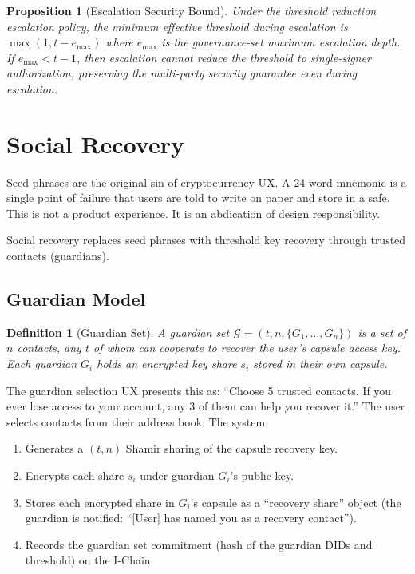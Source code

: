 \documentclass[11pt,a4paper]{article}
\newtheorem{proposition}[theorem]{Proposition}
\newtheorem{definition}{Definition}
\begin{document}
\begin{proposition}[Escalation Security Bound]
Under the threshold reduction escalation policy, the minimum effective
threshold during escalation is $\max(1, t - e_{\max})$ where $e_{\max}$
is the governance-set maximum escalation depth. If $e_{\max} < t - 1$,
then escalation cannot reduce the threshold to single-signer authorization,
preserving the multi-party security guarantee even during escalation.
\end{proposition}

\section{Social Recovery}\label{sec:recovery}

Seed phrases are the original sin of cryptocurrency UX. A 24-word mnemonic
is a single point of failure that users are told to write on paper and store
in a safe. This is not a product experience. It is an abdication of design
responsibility.

Social recovery replaces seed phrases with threshold key recovery through
trusted contacts (guardians).

\subsection{Guardian Model}

\begin{definition}[Guardian Set]
A guardian set $\mathcal{G} = (t, n, \{G_1, \ldots, G_n\})$ is a set of
$n$ contacts, any $t$ of whom can cooperate to recover the user's capsule
access key. Each guardian $G_i$ holds an encrypted key share $s_i$ stored
in their own capsule.
\end{definition}

The guardian selection UX presents this as: ``Choose 5 trusted contacts.
If you ever lose access to your account, any 3 of them can help you
recover it.'' The user selects contacts from their address book. The
system:

\begin{enumerate}
    \item Generates a $(t, n)$ Shamir sharing of the capsule recovery key.
    \item Encrypts each share $s_i$ under guardian $G_i$'s public key.
    \item Stores each encrypted share in $G_i$'s capsule as a ``recovery
    share'' object (the guardian is notified: ``[User] has named you as
    a recovery contact'').
    \item Records the guardian set commitment (hash of the guardian DIDs
    and threshold) on the I-Chain.
\end{enumerate}
\end{document}
